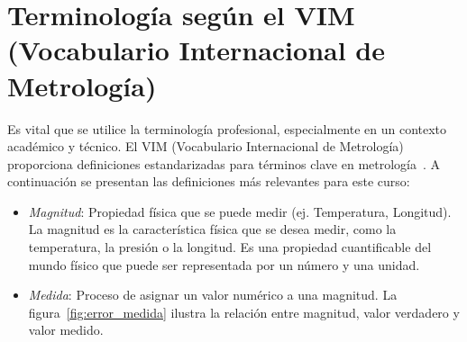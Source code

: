 \section{Terminología según el VIM (Vocabulario Internacional de Metrología)}\label{sec:terminologia-vim}

Es vital que se utilice la terminología profesional, especialmente en un contexto académico y técnico. El VIM (Vocabulario Internacional de Metrología) proporciona definiciones estandarizadas para términos clave en metrología~\cite{jcgm200_2012_vim}. A continuación se presentan las definiciones más relevantes para este curso:

\begin{itemize}
    \item \emph{Magnitud}: Propiedad física que se puede medir (ej. Temperatura, Longitud). La magnitud es la característica física que se desea medir, como la temperatura, la presión o la longitud. Es una propiedad cuantificable del mundo físico que puede ser representada por un número y una unidad. 
    \item \emph{Medida}: Proceso de asignar un valor numérico a una magnitud. La figura~\ref{fig:error_medida} ilustra la relación entre magnitud, valor verdadero y valor medido.

    \begin{marginfigure}
    \centering
    \shorthandoff{>}
\end{marginfigure}
\end{itemize}
